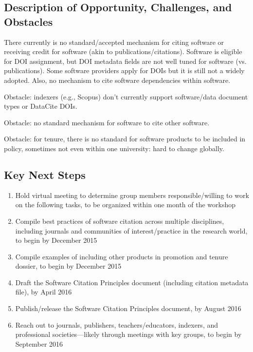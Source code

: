 \subsection{Description of Opportunity, Challenges, and Obstacles}

There currently is no standard/accepted mechanism for citing software or receiving credit for software (akin to publications/citations).
Software is eligible for DOI assignment, but DOI metadata fields are not well tuned for software (vs. publications).
Some software providers apply for DOIs but it is still not a widely adopted.
Also, no mechanism to cite software dependencies within software.

Obstacle: indexers (e.g., Scopus) don’t currently support software/data document types or DataCite DOIs.

Obstacle: no standard mechanism for software to cite other software.

Obstacle: for tenure, there is no standard for software products to be included in policy,
sometimes not even within one university: hard to change globally.

\subsection{Key Next Steps}

\begin{enumerate}
\item Hold virtual meeting to determine group members responsible\slash willing to work on the following tasks, to be organized within one month of the workshop
\item Compile best practices of software citation across multiple disciplines, including journals and communities of interest\slash practice in the research world, to begin by December 2015
\item Compile examples of including other products in promotion and tenure dossier, to begin by December 2015
\item Draft the Software Citation Principles document (including citation metadata file), by April 2016
\item Publish\slash release the Software Citation Principles document, by August 2016
\item Reach out to journals, publishers, teachers\slash educators, indexers, and professional societies---likely through meetings with key groups, to begin by September 2016

\end{enumerate}

